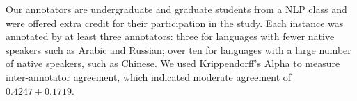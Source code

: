 Our annotators are undergraduate and graduate students from a NLP class and were offered extra credit for their participation in the study. Each instance was annotated by at least three annotators: three for languages with fewer native speakers such as Arabic and Russian; over ten for languages with a large number of native speakers, such as Chinese. We used Krippendorff’s Alpha \citep{krippendorffalpha} to measure inter-annotator agreement, which indicated moderate agreement of $0.4247 \pm 0.1719$.



